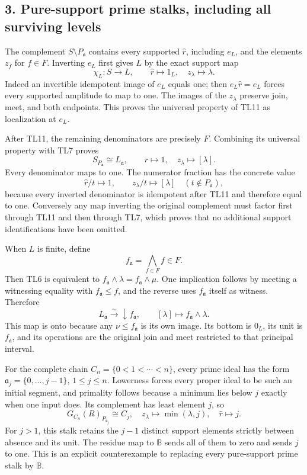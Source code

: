 \subsection{3. Pure-support prime stalks, including all surviving
levels}\label{pure-support-prime-stalks-including-all-surviving-levels}

The complement \(S\setminus P_{\mathfrak a}\) contains every supported
\(\widehat r\), including \(e_L\), and the elements \(z_f\) for
\(f\in F\). Inverting \(e_L\) first gives \(L\) by the exact support map
\[
 \chi_L:S\longrightarrow L,\qquad
 \widehat r\mapsto1_L,\quad z_\lambda\mapsto\lambda.
 \tag{TL11}
\] Indeed an invertible idempotent image of \(e_L\) equals one; then
\(e_L\widehat r=e_L\) forces every supported amplitude to map to one.
The images of the \(z_\lambda\) preserve join, meet, and both endpoints.
This proves the universal property of TL11 as localization at \(e_L\).

After TL11, the remaining denominators are precisely \(F\). Combining
its universal property with TL7 proves \[
 \boxed{S_{P_{\mathfrak a}}\cong L_{\mathfrak a},\qquad
 \widehat r\mapsto1,\quad z_\lambda\mapsto[\lambda].}
 \tag{TL12}
\] Every denominator maps to one. The numerator fraction has the
concrete value \[
 \widehat r/t\longmapsto1,\qquad z_\lambda/t\longmapsto[\lambda]
 \quad(t\notin P_{\mathfrak a}),
\] because every inverted denominator is idempotent after TL11 and
therefore equal to one. Conversely any map inverting the original
complement must factor first through TL11 and then through TL7, which
proves that no additional support identifications have been omitted.

When \(L\) is finite, define \[
 f_{\mathfrak a}=\bigwedge_{f\in F}f\in F.
 \tag{TL13}
\] Then TL6 is equivalent to
\(f_{\mathfrak a}\wedge\lambda=f_{\mathfrak a}\wedge\mu\). One
implication follows by meeting a witnessing equality with
\(f_{\mathfrak a}\le f\), and the reverse uses \(f_{\mathfrak a}\)
itself as witness. Therefore \[
 \boxed{L_{\mathfrak a}\xrightarrow{\sim}\downarrow f_{\mathfrak a},\qquad
 [\lambda]\mapsto f_{\mathfrak a}\wedge\lambda.}
 \tag{TL14}
\] This map is onto because any \(\nu\le f_{\mathfrak a}\) is its own
image. Its bottom is \(0_L\), its unit is \(f_{\mathfrak a}\), and its
operations are the original join and meet restricted to that principal
interval.

For the complete chain \(C_n=\{0<1<\cdots<n\}\), every prime ideal has
the form \(\mathfrak a_j=\{0,\ldots,j-1\}\), \(1\le j\le n\). Lowerness
forces every proper ideal to be such an initial segment, and primality
follows because a minimum lies below \(j\) exactly when one input does.
Its complement has least element \(j\), so \[
 \boxed{G_{C_n}(R)_{P_{\mathfrak a_j}}\cong C_j,
 \quad z_\lambda\mapsto\min(\lambda,j),\quad\widehat r\mapsto j.}
 \tag{TL15}
\] For \(j>1\), this stalk retains the \(j-1\) distinct support elements
strictly between absence and its unit. The residue map to \(\mathbb B\)
sends all of them to zero and sends \(j\) to one. This is an explicit
counterexample to replacing every pure-support prime stalk by
\(\mathbb B\).


